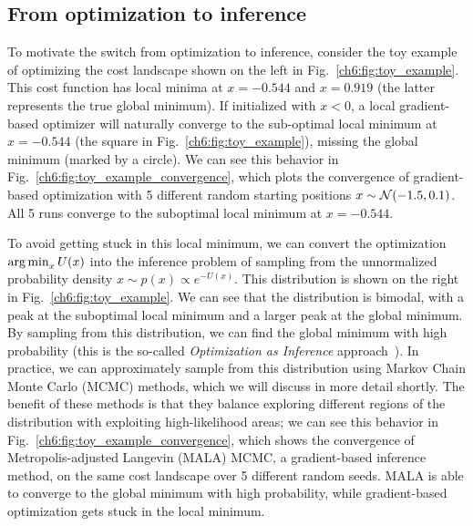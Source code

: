


\subsection{From optimization to inference}

To motivate the switch from optimization to inference, consider the toy example of optimizing the cost landscape shown on the left in Fig.~\ref{ch6:fig:toy_example}. This cost function has local minima at $x = -0.544$ and $x = 0.919$ (the latter represents the true global minimum). If initialized with $x < 0$, a local gradient-based optimizer will naturally converge to the sub-optimal local minimum at $x = -0.544$ (the square in Fig.~\ref{ch6:fig:toy_example}), missing the global minimum (marked by a circle). We can see this behavior in Fig.~\ref{ch6:fig:toy_example_convergence}, which plots the convergence of gradient-based optimization with 5 different random starting positions $x\sim\mathcal{N}(-1.5, 0.1)$. All 5 runs converge to the suboptimal local minimum at $x = -0.544$.

To avoid getting stuck in this local minimum, we can convert the optimization $\operatorname*{arg\,min}_x U(x)$ into the inference problem of sampling from the unnormalized probability density $x \sim p(x) \propto e^{-U(x)}$. This distribution is shown on the right in Fig.~\ref{ch6:fig:toy_example}. We can see that the distribution is bimodal, with a peak at the suboptimal local minimum and a larger peak at the global minimum. By sampling from this distribution, we can find the global minimum with high probability (this is the so-called \textit{Optimization as Inference} approach~\cite{maSamplingCanBe2019,levineReinforcementLearningControl2018a}). In practice, we can approximately sample from this distribution using Markov Chain Monte Carlo (MCMC) methods, which we will discuss in more detail shortly. The benefit of these methods is that they balance exploring different regions of the distribution with exploiting high-likelihood areas; we can see this behavior in Fig.~\ref{ch6:fig:toy_example_convergence}, which shows the convergence of Metropolis-adjusted Langevin (MALA) MCMC, a gradient-based inference method, on the same cost landscape over 5 different random seeds. MALA is able to converge to the global minimum with high probability, while gradient-based optimization gets stuck in the local minimum.

